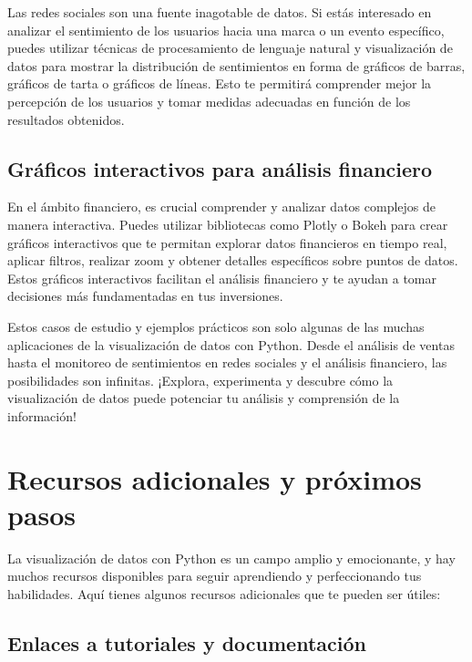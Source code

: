 \documentclass[
  a4paper,
]{article}
\begin{document}
Las redes sociales son una fuente inagotable de datos. Si estás
interesado en analizar el sentimiento de los usuarios hacia una marca o
un evento específico, puedes utilizar técnicas de procesamiento de
lenguaje natural y visualización de datos para mostrar la distribución
de sentimientos en forma de gráficos de barras, gráficos de tarta o
gráficos de líneas. Esto te permitirá comprender mejor la percepción de
los usuarios y tomar medidas adecuadas en función de los resultados
obtenidos.

\hypertarget{gruxe1ficos-interactivos-para-anuxe1lisis-financiero}{%
\subsection{Gráficos interactivos para análisis
financiero}\label{gruxe1ficos-interactivos-para-anuxe1lisis-financiero}}

En el ámbito financiero, es crucial comprender y analizar datos
complejos de manera interactiva. Puedes utilizar bibliotecas como Plotly
o Bokeh para crear gráficos interactivos que te permitan explorar datos
financieros en tiempo real, aplicar filtros, realizar zoom y obtener
detalles específicos sobre puntos de datos. Estos gráficos interactivos
facilitan el análisis financiero y te ayudan a tomar decisiones más
fundamentadas en tus inversiones.

Estos casos de estudio y ejemplos prácticos son solo algunas de las
muchas aplicaciones de la visualización de datos con Python. Desde el
análisis de ventas hasta el monitoreo de sentimientos en redes sociales
y el análisis financiero, las posibilidades son infinitas. ¡Explora,
experimenta y descubre cómo la visualización de datos puede potenciar tu
análisis y comprensión de la información!

\hypertarget{recursos-adicionales-y-pruxf3ximos-pasos}{%
\section{Recursos adicionales y próximos
pasos}\label{recursos-adicionales-y-pruxf3ximos-pasos}}

La visualización de datos con Python es un campo amplio y emocionante, y
hay muchos recursos disponibles para seguir aprendiendo y perfeccionando
tus habilidades. Aquí tienes algunos recursos adicionales que te pueden
ser útiles:

\hypertarget{enlaces-a-tutoriales-y-documentaciuxf3n}{%
\subsection{Enlaces a tutoriales y
documentación}\label{enlaces-a-tutoriales-y-documentaciuxf3n}}
\end{document}
